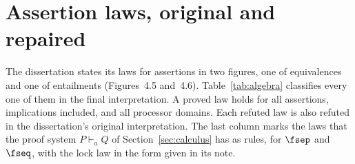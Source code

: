\FloatBarrier
\section{Assertion laws, original and repaired}
\label{app:statements}
\label{app:assertion-rules}

The dissertation states its laws for assertions in two figures, one of
equivalences and one of entailments (Figures~4.5 and~4.6).
Table~\ref{tab:algebra} classifies every one of them in the final
interpretation. A proved law holds for all assertions, implications
included, and all processor domains. Each refuted law is also refuted in
the dissertation's original interpretation. The last column marks the laws
that the proof system $P \vdash_a Q$ of Section~\ref{sec:calculus} has as
rules, for $\fsep$ and $\fseq$, with the lock law in the form given in
its note.

